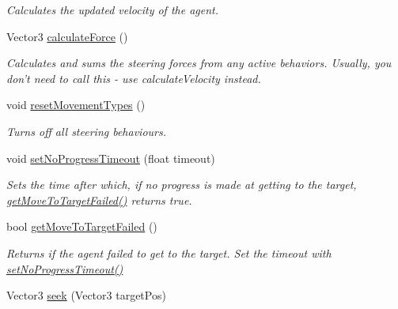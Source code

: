 \begin{DoxyCompactItemize}
\begin{DoxyCompactList}\small\item\em \-Calculates the updated velocity of the agent. \end{DoxyCompactList}\item 
\hypertarget{classAIMovementController_a1ac55952d3a6a8f5360a285dd3554cb5}{
\-Vector3 \hyperlink{classAIMovementController_a1ac55952d3a6a8f5360a285dd3554cb5}{calculate\-Force} ()}
\label{d2/d30/classAIMovementController_a1ac55952d3a6a8f5360a285dd3554cb5}

\begin{DoxyCompactList}\small\item\em \-Calculates and sums the steering forces from any active behaviors. \-Usually, you don't need to call this -\/ use calculate\-Velocity instead. \end{DoxyCompactList}\item 
\hypertarget{classAIMovementController_a77b434b120ac1b0f37a37a799ff2a81c}{
void \hyperlink{classAIMovementController_a77b434b120ac1b0f37a37a799ff2a81c}{reset\-Movement\-Types} ()}
\label{d2/d30/classAIMovementController_a77b434b120ac1b0f37a37a799ff2a81c}

\begin{DoxyCompactList}\small\item\em \-Turns off all steering behaviours. \end{DoxyCompactList}\item 
\hypertarget{classAIMovementController_a362dbeec65886ac5e8cf7d566b542151}{
void \hyperlink{classAIMovementController_a362dbeec65886ac5e8cf7d566b542151}{set\-No\-Progress\-Timeout} (float timeout)}
\label{d2/d30/classAIMovementController_a362dbeec65886ac5e8cf7d566b542151}

\begin{DoxyCompactList}\small\item\em \-Sets the time after which, if no progress is made at getting to the target, \hyperlink{classAIMovementController_a0ed562421611af8041b8998a65c33993}{get\-Move\-To\-Target\-Failed()} returns true. \end{DoxyCompactList}\item 
\hypertarget{classAIMovementController_a0ed562421611af8041b8998a65c33993}{
bool \hyperlink{classAIMovementController_a0ed562421611af8041b8998a65c33993}{get\-Move\-To\-Target\-Failed} ()}
\label{d2/d30/classAIMovementController_a0ed562421611af8041b8998a65c33993}

\begin{DoxyCompactList}\small\item\em \-Returns if the agent failed to get to the target. \-Set the timeout with \hyperlink{classAIMovementController_a362dbeec65886ac5e8cf7d566b542151}{set\-No\-Progress\-Timeout()} \end{DoxyCompactList}\item 
\hypertarget{classAIMovementController_a85fce22e4b0400cd7947c9655b20ea1b}{
\-Vector3 \hyperlink{classAIMovementController_a85fce22e4b0400cd7947c9655b20ea1b}{seek} (\-Vector3 target\-Pos)}
\label{d2/d30/classAIMovementController_a85fce22e4b0400cd7947c9655b20ea1b}


\end{DoxyCompactItemize}
